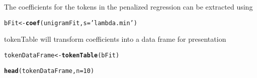 \documentclass{article}\usepackage[]{graphicx}\usepackage[]{color}
\makeatletter
\newcommand{\hlnum}[1]{\textcolor[rgb]{0.686,0.059,0.569}{#1}}%
\newcommand{\hlstr}[1]{\textcolor[rgb]{0.192,0.494,0.8}{#1}}%
\newcommand{\hlstd}[1]{\textcolor[rgb]{0.345,0.345,0.345}{#1}}%
\newcommand{\hlkwb}[1]{\textcolor[rgb]{0.69,0.353,0.396}{#1}}%
\newcommand{\hlkwc}[1]{\textcolor[rgb]{0.333,0.667,0.333}{#1}}%
\newcommand{\hlkwd}[1]{\textcolor[rgb]{0.737,0.353,0.396}{\textbf{#1}}}%
\newenvironment{kframe}{%
 \def\at@end@of@kframe{}%
 \ifinner\ifhmode%
  \def\at@end@of@kframe{\end{minipage}}%
  \begin{minipage}{\columnwidth}%
 \fi\fi%
 \def\FrameCommand##1{\hskip\@totalleftmargin \hskip-\fboxsep
 \colorbox{shadecolor}{##1}\hskip-\fboxsep
     \hskip-\linewidth \hskip-\@totalleftmargin \hskip\columnwidth}%
 \MakeFramed {\advance\hsize-\width
   \@totalleftmargin\z@ \linewidth\hsize
   \@setminipage}}%
 {\par\unskip\endMakeFramed%
 \at@end@of@kframe}
\newenvironment{knitrout}{}{} %
\newcommand{\pkg}[1]{{\fontseries{b}\selectfont #1}}
\makeatother
\begin{document}
The coefficients for the tokens in the penalized regression can be extracted using
\begin{knitrout}\footnotesize
{}\color{fgcolor}\begin{kframe}
\begin{alltt}
\hlstd{bFit} \hlkwb{<-} \hlkwd{coef}\hlstd{(unigramFit ,} \hlkwc{s}\hlstd{=}\hlstr{'lambda.min'}\hlstd{)}
\end{alltt}
\end{kframe}
\end{knitrout}

\pkg{tokenTable} will transform coefficients into a data frame for presentation

\begin{knitrout}\footnotesize
{}\color{fgcolor}\begin{kframe}
\begin{alltt}
\hlstd{tokenDataFrame} \hlkwb{<-} \hlkwd{tokenTable}\hlstd{(bFit)}
\end{alltt}


{\ttfamily\noindent\bfseries{}}\begin{alltt}
\hlkwd{head}\hlstd{(tokenDataFrame ,} \hlkwc{n}\hlstd{=}\hlnum{10}\hlstd{)}
\end{alltt}


{\ttfamily\noindent\bfseries\color{errorcolor}{\#\# Error in head(tokenDataFrame, n = 10): object 'tokenDataFrame' not found}}\end{kframe}
\end{knitrout}
\end{document}

